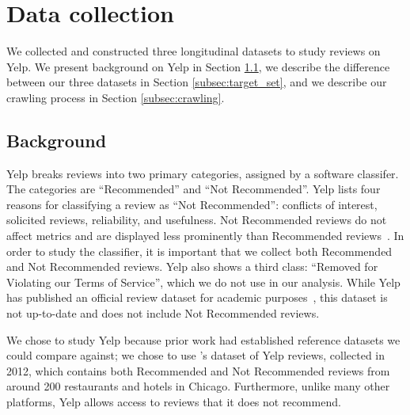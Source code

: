 \section{Data collection} \label{sec:dataset}

We collected and constructed three longitudinal datasets to study reviews on Yelp. We present background on Yelp in Section \ref{subsec:background}, we describe the difference between our three datasets in Section \ref{subsec:target_set}, and we describe our crawling process in Section \ref{subsec:crawling}.




 

\subsection{Background} \label{subsec:background}

Yelp breaks reviews into two primary categories, assigned by a software classifer. The categories are ``Recommended'' and ``Not Recommended''. Yelp lists four reasons for classifying a review as ``Not Recommended'': conflicts of interest, solicited reviews, reliability, and usefulness. Not Recommended reviews do not affect metrics and are displayed less prominently than Recommended reviews~\cite{yelpwhyrec,yelprecommendationsoftware,yelpstarrating}. In order to study the classifier, it is important that we collect both Recommended and Not Recommended reviews. Yelp also shows a third class: ``Removed for Violating our Terms of Service'', which we do not use in our analysis. While Yelp has published an official review dataset for academic purposes~\cite{yelpacademicdataset}, this dataset is not up-to-date and does not include Not Recommended reviews.

We chose to study Yelp because prior work had established reference datasets we could compare against; we chose to use \citet{mukherjee2013yelp}'s dataset of Yelp reviews, collected in 2012, which contains both Recommended and Not Recommended reviews from around 200 restaurants and hotels in Chicago.
Furthermore, unlike many other platforms, Yelp allows access to reviews that it does not recommend.







